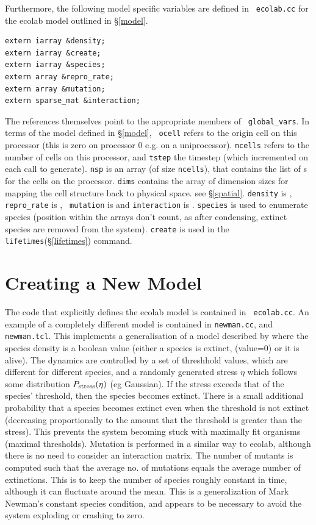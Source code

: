 Furthermore, the following model specific variables are defined in {\tt
  ecolab.cc} for the ecolab model outlined in \S\ref{model}.
\begin{verbatim}
extern iarray &density;
extern iarray &create;
extern iarray &species;
extern array &repro_rate;
extern array &mutation;
extern sparse_mat &interaction;
\end{verbatim}
The references themselves point to the appropriate members of {\tt
  global\_vars}. In terms of the model defined in \S\ref{model}, {\tt
  ocell} refers to the origin cell on this processor (this is zero on
processor 0 e.g. on a uniprocessor). {\tt ncells} refers to the number
of cells on this processor, and {\tt tstep} the timestep (which
incremented on each call to generate). {\tt nsp} is an array (of size
{\tt ncells}), that contains the list of \nsp{}s for the cells on the
processor. {\tt dims} contains the array of dimension sizes for
mapping the cell structure back to physical space. see
\S\ref{spatial}. {\tt density} is \bn, {\tt repro\_rate} is \br, {\tt
  mutation} is \bmu{} and {\tt interaction} is \bbeta. {\tt species}
is used to enumerate species (position within the arrays don't count,
as after condensing, extinct species are removed from the system).
{\tt create} is used in the {\tt lifetimes}(\S\ref{lifetimes})
command.

\section{Creating a New Model}\label{new model}

The code that explicitly defines the ecolab model is contained in {\tt
  ecolab.cc}. An example of a completely different model is contained in
{\tt newman.cc}, and {\tt newman.tcl}.  This implements a generalisation
of a model described by \cite{Newman97} where the species density is a
boolean value (either a species is extinct, (value=0) or it is alive). The
dynamics are controlled by a set of threshhold values, which are different
for different species, and a randomly generated stress $\eta$ which
follows some distribution $P_{\rm stress}(\eta)$ (eg Gaussian). If the
stress exceeds that of the species' threshold, then the species becomes
extinct. There is a small additional probability that a species becomes
extinct even when the threshold is not extinct (decreasing proportionally
to the amount that the threshold is greater than the stress). This
prevents the system becoming stuck with maximally fit organisms (maximal
thresholds). Mutation is performed in a similar way to ecolab, although
there is no need to consider an interaction matrix. The number of mutants
is computed such that the average no. of mutations equals the average
number of extinctions. This is to keep the number of species roughly
constant in time, although it can fluctuate around the mean. This is a
generalization of Mark Newman's constant species condition, and appears to
be necessary to avoid the system exploding or crashing to zero.

